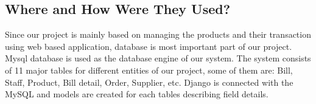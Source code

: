 \subsection{Where and How Were They Used?}

Since our project is mainly based on
managing the products and their transaction using web based application,
database is most important part of our project. Mysql database is used as
the database engine of our system. The system consists of 11 major tables
for different entities of our project, some of them are: Bill, Staff,
Product, Bill detail, Order, Supplier, etc. Django is connected with the
MySQL and models are created for each tables describing field details.

